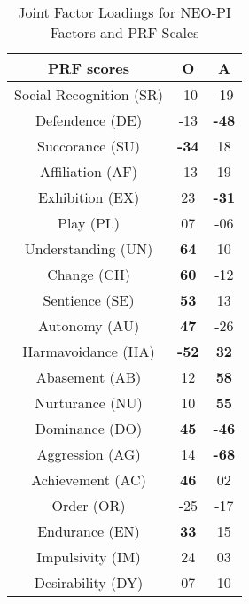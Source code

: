 \begin{table} [h]
\centering
\begin{tabular}{c c c} 
\\
 \hline \hline
PRF	scores				& \textbf{O} 	&\textbf{A}	\\ [0.5ex] 
 \hline
 Social Recognition (SR)		& -10 		& -19		\\ 
 Defendence (DE)			& -13		& \textbf{-48}	\\
 Succorance (SU)			& \textbf{-34}	& 18			\\
 Affiliation (AF)				& -13  		& 19			\\
 Exhibition (EX)				& 23			& \textbf{-31}	\\
 Play (PL)					& 07			& -06		\\
 Understanding (UN)			& \textbf{64}	& 10			\\
 Change (CH)				& \textbf{60}	& -12		\\
 Sentience (SE)				& \textbf{53}	& 13			\\
 Autonomy (AU)			& \textbf{47}	& -26		\\
 Harmavoidance (HA)		& \textbf{-52}	& \textbf{32}	\\
 Abasement (AB)			& 12			& \textbf{58}	\\
 Nurturance (NU)			& 10			& \textbf{55}	\\
 Dominance (DO)			& \textbf{45}	& \textbf{-46}	\\
 Aggression (AG)			& 14			& \textbf{-68}	\\
 Achievement (AC)			& \textbf{46}	& 02			\\
 Order (OR)				& -25		& -17		\\
 Endurance (EN)			& \textbf{33}	& 15			\\
 Impulsivity (IM)				& 24			& 03			\\
 Desirability (DY)			& 07			& 10			\\ [1ex] 
 \hline \hline		
 \end{tabular}
\caption{Joint Factor Loadings for NEO-PI Factors and PRF Scales}
 \label{table:2}
 \end{table}

